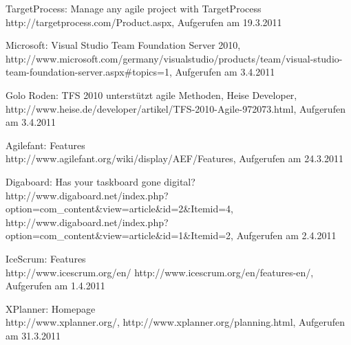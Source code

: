 \documentclass[german,english]{header}
\begin{document}
\begin{thebibliography}{5}
TargetProcess: Manage any agile project with TargetProcess\\
http://targetprocess.com/Product.aspx,
Aufgerufen am 19.3.2011

Microsoft:
Visual Studio Team Foundation Server 2010,
http://www.microsoft.com/germany/visualstudio/products/team/visual-studio-team-foundation-server.aspx\#topics=1,
Aufgerufen am 3.4.2011

Golo Roden: 
TFS 2010 unterstützt agile Methoden, Heise Developer,
http://www.heise.de/developer/artikel/TFS-2010-Agile-972073.html,
Aufgerufen am 3.4.2011

Agilefant: Features\\ 
http://www.agilefant.org/wiki/display/AEF/Features,
Aufgerufen am 24.3.2011

Digaboard: Has your taskboard gone digital?
http://www.digaboard.net/index.php?option=com\_content\&view=article\&id=2\&Itemid=4,
http://www.digaboard.net/index.php?option=com\_content\&view=article\&id=1\&Itemid=2,
Aufgerufen am 2.4.2011

IceScrum: Features\\
http://www.icescrum.org/en/
http://www.icescrum.org/en/features-en/,
Aufgerufen am 1.4.2011

XPlanner: Homepage\\
http://www.xplanner.org/,
http://www.xplanner.org/planning.html,
Aufgerufen am 31.3.2011

\end{thebibliography}
\end{document}
